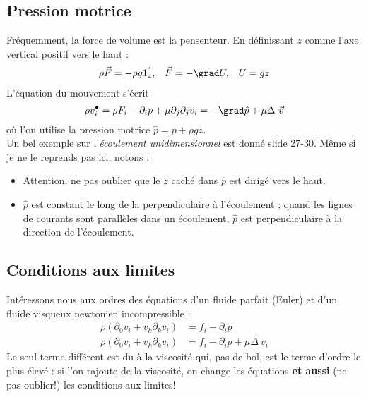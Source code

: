 		
	\subsection{Pression motrice}
	Fréquemment, la force de volume est la pensenteur. En définissant $z$ comme l'axe
	vertical positif vers le haut :
	\begin{equation}
	\begin{array}{ccc}
	\rho\vec{F}=-\rho g\vec{1_z}, & \vec{F}=-\grad U, & U=gz
	\end{array}
	\end{equation}
	L'équation du mouvement s'écrit 
	\begin{equation}
	\rho v_i^\bullet = \rho F_i - \partial_i p +\mu\partial_j\partial_jv_i = -\grad\hat{p}
	+\mu\Delta\ \vec v
	\end{equation}
	où l'on utilise la pression motrice $\hat{p}=p+\rho gz$.\\
	Un bel exemple sur l'\textit{écoulement unidimensionnel} est donné slide 27-30. Même 
	si je ne le reprends pas ici, notons :
	\begin{itemize}
	\item Attention, ne pas oublier que le $z$ caché dans $\hat{p}$ est dirigé vers le 
	haut.
	\item $\hat{p}$ est constant le long de la perpendiculaire à l'écoulement ; quand les 
	lignes de courants sont parallèles dans un écoulement, $\hat{p}$ est perpendiculaire 
	à la direction de l'écoulement.
	\end{itemize}
	
	
	\subsection{Conditions aux limites}
	Intéressons nous aux ordres des équations d'un fluide parfait (Euler) et d'un fluide 
	visqueux newtonien incompressible :
	\begin{equation}
	\begin{array}{ll}
	\rho(\partial_0v_i + v_k\partial_kv_i) &= f_i-\partial_i p\\
	\rho(\partial_0v_i + v_k\partial_kv_i) &= f_i-\partial_i p + \mu\Delta\ v_i
	\end{array}
	\end{equation}
	Le seul terme différent est du à la viscosité qui, pas de bol, est le terme d'ordre 
	le plus élevé : si l'on rajoute de la viscosité, on change les équations \textbf{et 
	aussi} (ne pas oublier!) les conditions aux limites!
	
